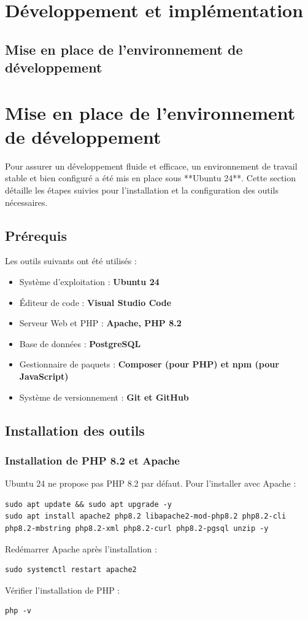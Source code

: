 \section{Développement et implémentation}
\subsection{Mise en place de l’environnement de développement}
\section{Mise en place de l’environnement de développement}

Pour assurer un développement fluide et efficace, un environnement de travail stable et bien configuré a été mis en place sous **Ubuntu 24**. Cette section détaille les étapes suivies pour l’installation et la configuration des outils nécessaires.

\subsection{Prérequis}
Les outils suivants ont été utilisés :
\begin{itemize}
    \item Système d’exploitation : \textbf{Ubuntu 24}
    \item Éditeur de code : \textbf{Visual Studio Code}
    \item Serveur Web et PHP : \textbf{Apache, PHP 8.2}
    \item Base de données : \textbf{PostgreSQL}
    \item Gestionnaire de paquets : \textbf{Composer (pour PHP) et npm (pour JavaScript)}
    \item Système de versionnement : \textbf{Git et GitHub}
\end{itemize}

\subsection{Installation des outils}

\subsubsection{Installation de PHP 8.2 et Apache}
Ubuntu 24 ne propose pas PHP 8.2 par défaut. Pour l’installer avec Apache :
\begin{verbatim}
sudo apt update && sudo apt upgrade -y
sudo apt install apache2 php8.2 libapache2-mod-php8.2 php8.2-cli php8.2-mbstring php8.2-xml php8.2-curl php8.2-pgsql unzip -y
\end{verbatim}
Redémarrer Apache après l’installation :
\begin{verbatim}
sudo systemctl restart apache2
\end{verbatim}
Vérifier l’installation de PHP :
\begin{verbatim}
php -v
\end{verbatim}

